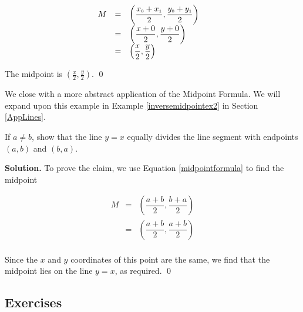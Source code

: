 \begin{ex}
\begin{enumerate}
\setlength{\extrarowheight}{10pt}

\[ \begin{array}{rclr}
 M & = & \left( \dfrac{x_{\mbox{\tiny$0$}}+x_{\mbox{\tiny$1$}}}{2},  \dfrac{y_{\mbox{\tiny$0$}}+y_{\mbox{\tiny$1$}}}{2} \right) & \\
   & = & \left( \dfrac{x+0}{2},  \dfrac{y+0}{2} \right) &   \\
   & = &  \left( \dfrac{x}{2},  \dfrac{y}{2} \right) &  \end{array} \]
   
 The midpoint is $\left(\frac{x}{2}, \frac{y}{2} \right)$. \qed

\end{enumerate}

\end{ex}


\label{inversemidpoint}

We close with a more abstract application of the Midpoint Formula.  We will expand upon this example in Example \ref{inversemidpointex2} in Section \ref{AppLines}.  

\begin{ex} \label{inversemidpointex1} If $a \neq b$, show that the line $y = x$ equally divides the line segment with endpoints $(a,b)$ and $(b,a)$.

\medskip

{\bf Solution.}  To prove the claim, we use Equation \ref{midpointformula} to find the midpoint  

\setlength{\extrarowheight}{10pt}

\[ \begin{array}{rcl}

 M & = & \left( \dfrac{a+b}{2},  \dfrac{b+a}{2} \right) \\
   & = & \left( \dfrac{a+b}{2},  \dfrac{a+b}{2} \right)  \\ \end{array} \]

Since the $x$ and $y$ coordinates of this point are the same, we find that the midpoint lies on the line $y=x$, as required. \qed

\end{ex}

\setlength{\extrarowheight}{2pt}

\clearpage

\subsection{Exercises}



\closegraphsfile